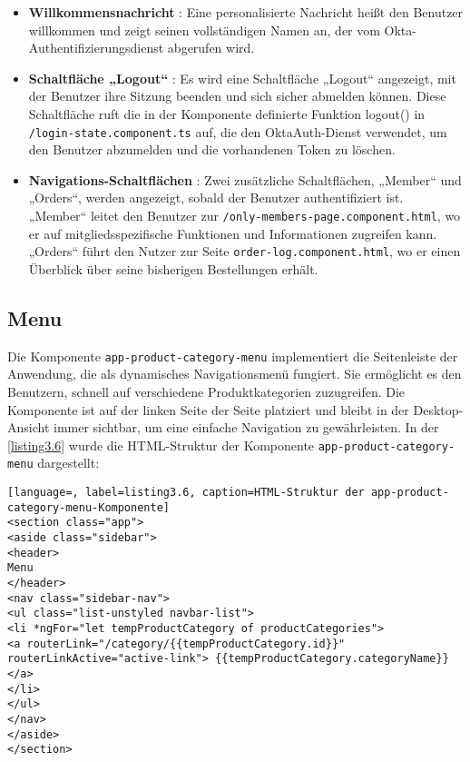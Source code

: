 \begin{itemize}
	\item \textbf{Willkommensnachricht} : Eine personalisierte Nachricht heißt den Benutzer willkommen und zeigt seinen vollständigen Namen an, der vom Okta-Authentifizierungsdienst abgerufen wird.
	\item \textbf{Schaltfläche „Logout“} : Es wird eine Schaltfläche „Logout“ angezeigt, mit der Benutzer ihre Sitzung beenden und sich sicher abmelden können. Diese Schaltfläche ruft die in der Komponente definierte Funktion logout() in \verb*|/login-state.component.ts| auf, die den OktaAuth-Dienst verwendet, um den Benutzer abzumelden und die vorhandenen Token zu löschen. 
	\item \textbf{Navigations-Schaltflächen} : Zwei zusätzliche Schaltflächen, „Member“ und „Orders“, werden angezeigt, sobald der Benutzer authentifiziert ist.\\ 
	„Member“ leitet den Benutzer zur \verb*|/only-members-page.component.html|, wo er auf mitgliedsspezifische Funktionen und Informationen zugreifen kann.\\
	„Orders“ führt den Nutzer zur Seite \verb*|order-log.component.html|, wo er einen Überblick über seine bisherigen Bestellungen erhält.
\end{itemize}

\subsection{Menu}

Die Komponente \verb*|app-product-category-menu| implementiert die Seitenleiste der Anwendung, die als dynamisches Navigationsmenü fungiert. Sie ermöglicht es den Benutzern, schnell auf verschiedene Produktkategorien zuzugreifen. Die Komponente ist auf der linken Seite der Seite platziert und bleibt in der Desktop-Ansicht immer sichtbar, um eine einfache Navigation zu gewährleisten. In der \ref{listing3.6} wurde die HTML-Struktur der Komponente \verb*|app-product-category-menu| dargestellt:

\begin{lstlisting}[language=, label=listing3.6, caption=HTML-Struktur der app-product-category-menu-Komponente]
<section class="app">
<aside class="sidebar">
<header>
Menu
</header>
<nav class="sidebar-nav">
<ul class="list-unstyled navbar-list">
<li *ngFor="let tempProductCategory of productCategories">
<a routerLink="/category/{{tempProductCategory.id}}" 
routerLinkActive="active-link"> {{tempProductCategory.categoryName}}
</a>
</li>
</ul>
</nav>
</aside>
</section>
\end{lstlisting}

